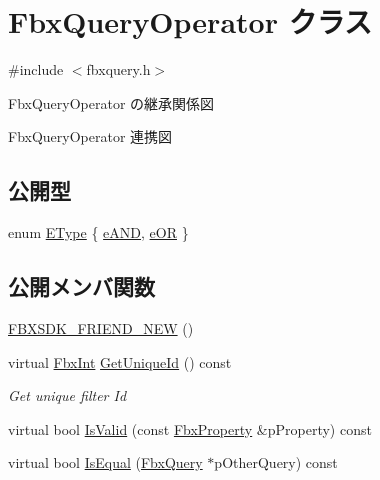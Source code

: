 \hypertarget{class_fbx_query_operator}{}\section{Fbx\+Query\+Operator クラス}
\label{class_fbx_query_operator}


{\ttfamily \#include $<$fbxquery.\+h$>$}



Fbx\+Query\+Operator の継承関係図


Fbx\+Query\+Operator 連携図
\subsection*{公開型}
\begin{DoxyCompactItemize}
\item 
enum \hyperlink{class_fbx_query_operator_aadf25d36a6eab339504a02ce57fd6ad4}{E\+Type} \{ \hyperlink{class_fbx_query_operator_aadf25d36a6eab339504a02ce57fd6ad4ab861a2519f4ff44677b5349143779999}{e\+A\+ND}, 
\hyperlink{class_fbx_query_operator_aadf25d36a6eab339504a02ce57fd6ad4ae85b5273733dbd8dd85f21dc92023cdb}{e\+OR}
 \}
\end{DoxyCompactItemize}
\subsection*{公開メンバ関数}
\begin{DoxyCompactItemize}
\item 
\hyperlink{class_fbx_query_operator_a3cd85ca0a8ff67d6670b36d06dcaf950}{F\+B\+X\+S\+D\+K\+\_\+\+F\+R\+I\+E\+N\+D\+\_\+\+N\+EW} ()
\item 
virtual \hyperlink{fbxtypes_8h_a088fa96de3b0b3ea69f0f6afef525dfb}{Fbx\+Int} \hyperlink{class_fbx_query_operator_a55d021e0103b5e7dc0f8a80e4b468314}{Get\+Unique\+Id} () const
\begin{DoxyCompactList}\small\item\em Get unique filter Id \end{DoxyCompactList}\item 
virtual bool \hyperlink{class_fbx_query_operator_a14dd8a653d1e802f43b60c13d137ccce}{Is\+Valid} (const \hyperlink{class_fbx_property}{Fbx\+Property} \&p\+Property) const
\item 
virtual bool \hyperlink{class_fbx_query_operator_aa96734a4da59286a2cab2832f0529175}{Is\+Equal} (\hyperlink{class_fbx_query}{Fbx\+Query} $\ast$p\+Other\+Query) const
\end{DoxyCompactItemize}
